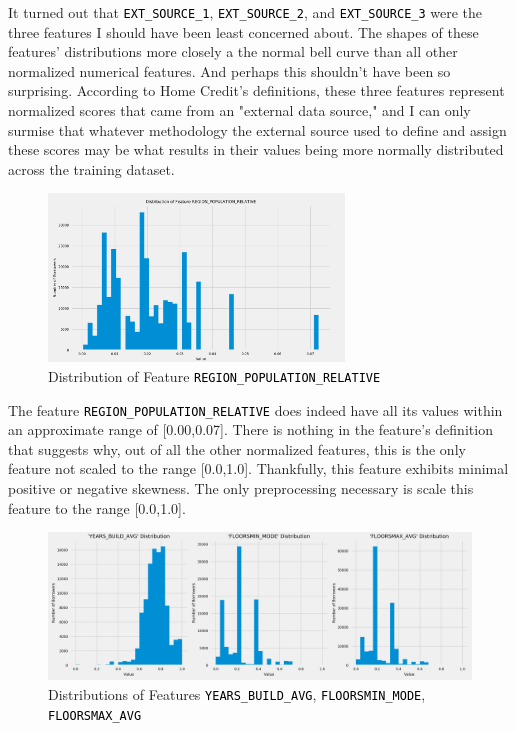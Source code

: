 \documentclass[12pt, letterpaper]{article}
\begin{document}
It turned out that \colorbox{backcolor}{\textcolor{black}{\texttt{EXT_SOURCE_1}}}, \colorbox{backcolor}{\textcolor{black}{\texttt{EXT_SOURCE_2}}}, and \colorbox{backcolor}{\textcolor{black}{\texttt{EXT_SOURCE_3}}} were the three features I should have been least concerned about. The shapes of these features' distributions more closely a the normal bell curve than all other normalized numerical features. And perhaps this shouldn't have been so surprising. According to Home Credit's definitions, these three features represent normalized scores that came from an "external data source," and I can only surmise that whatever methodology the external source used to define and assign these scores may be what results in their values being more normally distributed across the training dataset.

\begin{figure}[ht]
\includegraphics[width=0.7\textwidth]{distribREGIONPOPULATIONRELATIVE}
\centering
\caption{Distribution of Feature \colorbox{backcolor}{\textcolor{black}{\texttt{REGION_POPULATION_RELATIVE}}}}
\end{figure}

The feature \colorbox{backcolor}{\textcolor{black}{\texttt{REGION_POPULATION_RELATIVE}}} does indeed have all its values within an approximate range of [0.00,0.07]. There is nothing in the feature's definition that suggests why, out of all the other normalized features, this is the only feature not scaled to the range [0.0,1.0]. Thankfully, this feature exhibits minimal positive or negative skewness. The only preprocessing necessary is scale this feature to the range [0.0,1.0].

\begin{figure}[ht]
\includegraphics[width=\textwidth]{distribsYEARSBUILDAVGFLOORSMINMODEFLOORSMAXAVG}
\centering
\caption{Distributions of Features \colorbox{backcolor}{\textcolor{black}{\texttt{YEARS_BUILD_AVG}}}, \colorbox{backcolor}{\textcolor{black}{\texttt{FLOORSMIN_MODE}}}, \colorbox{backcolor}{\textcolor{black}{\texttt{FLOORSMAX_AVG}}}}
\end{figure}
\end{document}
